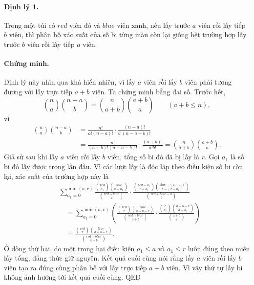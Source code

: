 \documentclass[11pt]{article}
\begin{document}
\paragraph{Định lý 1.}
Trong một túi có \(\mathit{red}\) viên đỏ và \(\mathit{blue}\) viên xanh, nếu
lấy trước \(a\) viên rồi lấy tiếp \(b\) viên, thì phân bố xác suất của số bi
từng màu còn lại giống hệt trường hợp lấy trước \(b\) viên rồi lấy tiếp
\(a\) viên.

\paragraph{Chứng minh.}
Định lý này nhìn qua khá hiển nhiên, vì lấy \(a\) viên rồi lấy \(b\) viên phải
tương đương với lấy trực tiếp \(a+b\) viên. Ta chứng minh bằng đại số. Trước
hết,
\[
  \binom{n}{a}\binom{n-a}{b}
  =\binom{n}{a+b}\binom{a+b}{a}
  \qquad(a+b\le n),
\]
vì
\[
\begin{aligned}
  \binom{n}{a}\binom{n-a}{b}
  &=
  \frac{n!}{a!(n-a)!}\cdot
  \frac{(n-a)!}{b!(n-a-b)!} \\
  &=
  \frac{n!}{(a+b)!(n-a-b)!}\cdot
  \frac{(a+b)!}{a!b!}
  =\binom{n}{a+b}\binom{a+b}{a}.
\end{aligned}
\]
Giả sử sau khi lấy \(a\) viên rồi lấy \(b\) viên, tổng số bi đỏ đã bị lấy là
\(r\). Gọi \(a_1\) là số bi đỏ lấy được trong lần đầu. Vì các lượt lấy là độc
lập theo điều kiện số bi còn lại, xác suất của trường hợp này là
\[
\begin{aligned}
&\sum_{a_1=0}^{\min(a,r)}
  \frac{\binom{\mathit{red}}{a_1}\binom{\mathit{blue}}{a-a_1}}
       {\binom{\mathit{red}+\mathit{blue}}{a}}
  \cdot
  \frac{\binom{\mathit{red}-a_1}{r-a_1}
        \binom{\mathit{blue}-(a-a_1)}{b-(r-a_1)}}
       {\binom{\mathit{red}+\mathit{blue}-a}{b}}\\
&\quad =
  \sum_{a_1=0}^{\min(a,r)}
  \left(
  \frac{\binom{\mathit{red}}{r}\binom{\mathit{blue}}{a+b-r}}
       {\binom{\mathit{red}+\mathit{blue}}{a+b}}
  \cdot
  \frac{\binom{r}{a_1}\binom{a+b-r}{a-a_1}}
       {\binom{a+b}{a}}
  \right)\\
&\quad =
  \frac{\binom{\mathit{red}}{r}\binom{\mathit{blue}}{a+b-r}}
       {\binom{\mathit{red}+\mathit{blue}}{a+b}}.
\end{aligned}
\]
Ở dòng thứ hai, do một trong hai điều kiện \(a_1\le a\) và \(a_1\le r\) luôn
đúng theo miền lấy tổng, đẳng thức giữ nguyên. Kết quả cuối cùng nói rằng lấy
\(a\) viên rồi lấy \(b\) viên tạo ra đúng cùng phân bố với lấy trực tiếp
\(a+b\) viên. Vì vậy thứ tự lấy bi không ảnh hưởng tới kết quả cuối cùng.
\(\text{QED}\)
\end{document}
